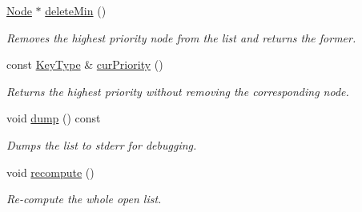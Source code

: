 \begin{DoxyCompactItemize}
\hyperlink{structslb_1_1ext_1_1policy_1_1openList_1_1BucketedStdMap__T_a20be12bd955d752d2ef9e78f7577c738}{Node} $\ast$ \hyperlink{structslb_1_1ext_1_1policy_1_1openList_1_1BucketedStdMap__T_a2e1f3b541a78adc315f5d5b7972270c7}{delete\+Min} ()
\begin{DoxyCompactList}\small\item\em Removes the highest priority node from the list and returns the former. \end{DoxyCompactList}\item 
const \hyperlink{structslb_1_1ext_1_1policy_1_1openList_1_1BucketedStdMap__T_a1236fe314465155339798c0f9c4c5ca8}{Key\+Type} \& \hyperlink{structslb_1_1ext_1_1policy_1_1openList_1_1BucketedStdMap__T_a17ebc907dda46e3bf1644ef741b3a898}{cur\+Priority} ()
\begin{DoxyCompactList}\small\item\em Returns the highest priority without removing the corresponding node. \end{DoxyCompactList}\item 
void \hyperlink{structslb_1_1ext_1_1policy_1_1openList_1_1BucketedStdMap__T_a4b2b0f37366941cf0424f39c597d7f6f}{dump} () const \hypertarget{structslb_1_1ext_1_1policy_1_1openList_1_1BucketedStdMap__T_a4b2b0f37366941cf0424f39c597d7f6f}{}\label{structslb_1_1ext_1_1policy_1_1openList_1_1BucketedStdMap__T_a4b2b0f37366941cf0424f39c597d7f6f}

\begin{DoxyCompactList}\small\item\em Dumps the list to {\ttfamily stderr} for debugging. \end{DoxyCompactList}\item 
void \hyperlink{structslb_1_1ext_1_1policy_1_1openList_1_1BucketedStdMap__T_a2bb00c5ed704472eea8da59ec2fd8bc1}{recompute} ()
\begin{DoxyCompactList}\small\item\em Re-\/compute the whole open list. \end{DoxyCompactList}\end{DoxyCompactItemize}
